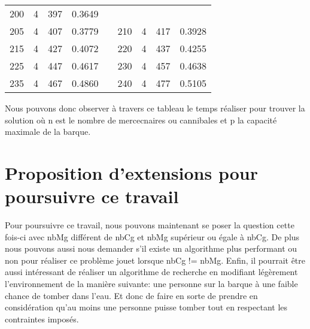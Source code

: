 \documentclass[a4paper, 12pt, french,oneside]{book}
\begin{document}
\begin{table}[!ht]
\begin{tabularx}{\linewidth}{|c|c|c|c|X|c|c|c|c|}
        200          & 4            & 397             & 0.3649                                                                                                           \\

        205          & 4            & 407             & 0.3779                        &  &

        210          & 4            & 417             & 0.3928                                                                                                           \\

        215          & 4            & 427             & 0.4072                        &  &

        220          & 4            & 437             & 0.4255                                                                                                           \\

        225          & 4            & 447             & 0.4617                        &  &

        230          & 4            & 457             & 0.4638                                                                                                           \\

        235          & 4            & 467             & 0.4860                        &  &

        240          & 4            & 477             & 0.5105                                                                                                           \\
        \cline{1-4}\cline{6-9}
    \end{tabularx}
\end{table}
Nous pouvons donc observer à travers ce tableau le temps réaliser pour trouver la solution où n est le nombre de mercecnaires ou cannibales et p la capacité maximale de la barque.

\chapter{Proposition d'extensions pour poursuivre ce travail}
Pour poursuivre ce travail, nous pouvons maintenant se poser la question cette fois-ci avec nbMg différent de nbCg et nbMg supérieur ou égale à nbCg. De plus nous pouvons aussi nous demander s'il existe un algorithme plus performant ou non pour réaliser ce problème jouet lorsque nbCg != nbMg.
Enfin, il pourrait être aussi intéressant de réaliser un algorithme de recherche en modifiant légèrement l'environnement de la manière suivante: une personne sur la barque à une faible chance de tomber dans l'eau. Et donc de faire en sorte de prendre en considération qu'au moins une personne puisse tomber tout en respectant les contraintes imposés.
\end{document}
